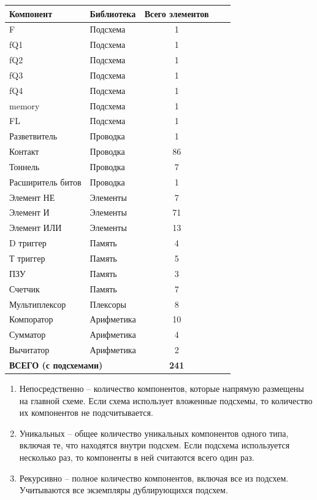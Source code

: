 \documentclass[11pt,a4paper,final]{article}
\begin{document}
	\begin{center}
		\label{tab:stats}
		\begin{tabular}{|l|l|c|c|c|}
			\hline
			\textbf{Компонент} & \textbf{Библиотека} & \textbf{Всего элементов} \\
			\hline
			F & Подсхема & 1 \\
			\hline
			fQ1 & Подсхема & 1 \\
			\hline
			fQ2 & Подсхема & 1 \\
			\hline
			fQ3 & Подсхема & 1 \\
			\hline
			fQ4 & Подсхема & 1 \\
			\hline
			memory & Подсхема & 1 \\
			\hline
			FL & Подсхема & 1 \\
			\hline
			Разветвитель & Проводка & 1 \\
			\hline
			Контакт & Проводка & 86 \\
			\hline
			Тоннель & Проводка & 7 \\
			\hline
			Расширитель битов & Проводка & 1 \\
			\hline
			Элемент НЕ & Элементы & 7 \\
			\hline
			Элемент И & Элементы & 71 \\
			\hline
			Элемент ИЛИ & Элементы  & 13 \\
			\hline
			D триггер & Память & 4 \\
			\hline
			Т триггер & Память & 5 \\
			\hline
			ПЗУ & Память & 3 \\
			\hline
			Счетчик & Память & 7 \\
			\hline
			Мультиплексор & Плексоры & 8 \\
			\hline
			Компоратор & Арифметика & 10 \\
			\hline
			Сумматор & Арифметика & 4 \\
			\hline
			Вычитатор & Арифметика  & 2 \\
			\hline
			\multicolumn{2}{|l|}{\textbf{ВСЕГО (с подсхемами)}} & \textbf{241} \\
			\hline
		\end{tabular}
	\end{center}
	
	\begin{enumerate}[label=]
		\item Непосредственно -- количество компонентов, которые напрямую размещены на главной схеме. Если схема использует вложенные подсхемы, то количество их компонентов не подсчитывается.
		\item Уникальных -- общее количество уникальных компонентов одного типа, включая те, что находятся внутри подсхем. Если подсхема используется несколько раз, то компоненты в ней считаются всего один раз.
		\item Рекурсивно -- полное количество компонентов, включая все из подсхем. Учитываются все экземпляры дублирующихся подсхем.
	\end{enumerate}
	
\end{document}
